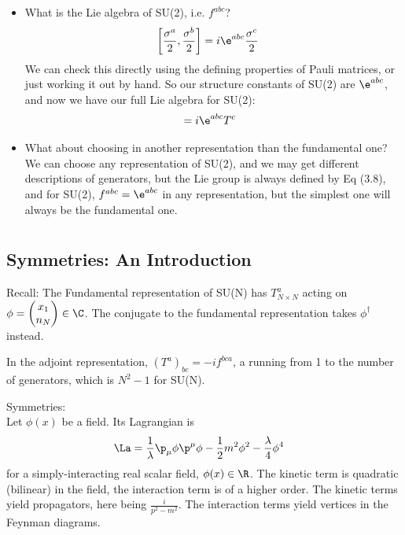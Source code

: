 \documentclass[relqm.tex]{subfiles}
\begin{document}
\begin{itemize}
    \item What is the Lie algebra of SU(2), i.e. $f^{abc}$?
        \begin{align}
            \left[\frac{\sigma^a}{2},\frac{\sigma^b}{2}\right] &= i\e^{abc}\frac{\sigma^c}{2}
        \end{align}
        We can check this directly using the defining properties of Pauli matrices, or just working it out by hand. 
        So our structure constants of SU(2) are $\e^{abc}$, and now we have our full Lie algebra for SU(2):
        \begin{align}
            [T^a,T^b] &= i\e^{abc}T^c
        \end{align}
    \item What about choosing in another representation than the fundamental one?\\
        We can choose any representation of SU(2), and we may get different descriptions of generators, but the Lie group is always defined by Eq (3.8), and for SU(2), $f^{abc} = \e^{abc}$ in any representation, but the simplest one will always be the fundamental one.
\end{itemize}

\chapter{}
\section{Symmetries: An Introduction}
Recall: The Fundamental representation of SU(N) has $T^a_{N\times N}$ acting on $\phi=\begin{pmatrix}x_1\\ n_N\end{pmatrix} \in \C$.
The conjugate to the fundamental representation takes $\phi^\dagger$ instead. 

In the adjoint representation, $(T^a)_{bc} = -if^{bca}$, a running from 1 to the number of generators, which is $N^2-1$ for SU(N).

Symmetries:\\
Let $\phi(x)$ be a field. 
Its Lagrangian is 
\begin{align}
    \La &= \frac{1}{\lambda}\p_\mu\phi\p^\mu\phi - \frac12m^2\phi^2 - \frac{\lambda}{4}\phi^4
\end{align}
for a simply-interacting real scalar field, $\phi(x)\in\R$.
The kinetic term is quadratic (bilinear) in the field, the interaction term is of a higher order. 
The kinetic terms yield propagators, here being $\frac{i}{p^2-m^2}$. 
The interaction terms yield vertices in the Feynman diagrams.
\end{document}
